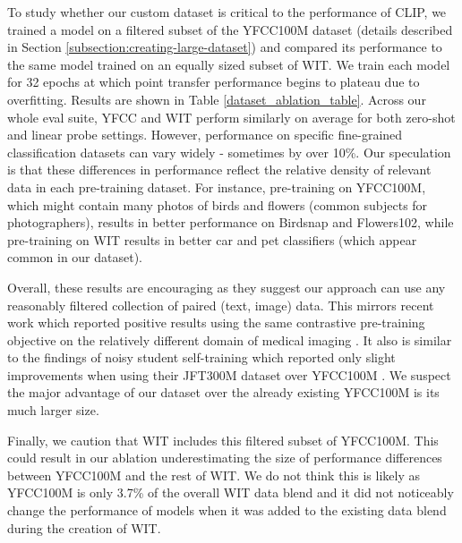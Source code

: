 \documentclass{article}
\begin{document}
To study whether our custom dataset is critical to the performance of CLIP, we trained a model on a filtered subset of the YFCC100M dataset (details described in Section \ref{subsection:creating-large-dataset}) and compared its performance to the same model trained on an equally sized subset of WIT. We train each model for 32 epochs at which point transfer performance begins to plateau due to overfitting. Results are shown in Table \ref{dataset_ablation_table}. Across our whole eval suite, YFCC and WIT perform similarly on average for both zero-shot and linear probe settings. However, performance on specific fine-grained classification datasets can vary widely - sometimes by over 10\%. Our speculation is that these differences in performance reflect the relative density of relevant data in each pre-training dataset. For instance, pre-training on YFCC100M, which might contain many photos of birds and flowers (common subjects for photographers), results in better performance on Birdsnap and Flowers102, while pre-training on WIT results in better car and pet classifiers (which appear common in our dataset).

Overall, these results are encouraging as they suggest our approach can use any reasonably filtered collection of paired (text, image) data. This mirrors recent work which reported positive results using the same contrastive pre-training objective on the relatively different domain of medical imaging \cite{zhang2020contrastive}. It also is similar to the findings of noisy student self-training which reported only slight improvements when using their JFT300M dataset over YFCC100M \cite{xie2020self}. We suspect the major advantage of our dataset over the already existing YFCC100M is its much larger size. 

Finally, we caution that WIT includes this filtered subset of YFCC100M. This could result in our ablation underestimating the size of performance differences between YFCC100M and the rest of WIT. We do not think this is likely as YFCC100M is only 3.7\% of the overall WIT data blend and it did not noticeably change the performance of models when it was added to the existing data blend during the creation of WIT.

\newcommand*\rot{\rotatebox{90}}
\newcommand{\xa}{\makebox[0pt][l]{}}
\newcommand{\xb}{\makebox[0pt][l]{}}
\newcommand{\xc}{\makebox[0pt][l]{}}
\newcommand{\xd}{\makebox[0pt][l]{}}
\newcommand{\xe}{\makebox[0pt][l]{}}
\newcommand{\xf}{\makebox[0pt][l]{}}
\newcommand{\xg}{\makebox[0pt][l]{}}
\newcommand{\xh}{\makebox[0pt][l]{}}
\newcommand{\xxi}{\makebox[0pt][l]{}}
\end{document}

